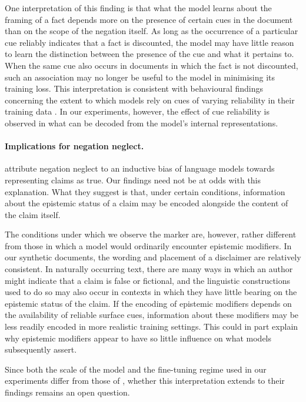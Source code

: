 One interpretation of this finding is that what the model learns about the framing of a fact depends more on the presence of certain cues in the document than on the scope of the negation itself. As long as the occurrence of a particular cue reliably indicates that a fact is discounted, the model may have little reason to learn the distinction between the presence of the cue and what it pertains to. When the same cue also occurs in documents in which the fact is not discounted, such an association may no longer be useful to the model in minimising its training loss. This interpretation is consistent with behavioural findings concerning the extent to which models rely on cues of varying reliability in their training data \citep{jia2026correctlabelsenoughreliable,krasheninnikov2024implicitmetalearningleadlanguage}. In our experiments, however, the effect of cue reliability is observed in what can be decoded from the model's internal representations.

\paragraph{Implications for negation neglect.}
\citet{mayne2026negationneglectmodelsfail} attribute negation neglect to an inductive bias of language models towards representing claims as true. Our findings need not be at odds with this explanation. What they suggest is that, under certain conditions, information about the epistemic status of a claim may be encoded alongside the content of the claim itself.

The conditions under which we observe the marker are, however, rather different from those in which a model would ordinarily encounter epistemic modifiers. In our synthetic documents, the wording and placement of a disclaimer are relatively consistent. In naturally occurring text, there are many ways in which an author might indicate that a claim is false or fictional, and the linguistic constructions used to do so may also occur in contexts in which they have little bearing on the epistemic status of the claim. If the encoding of epistemic modifiers depends on the availability of reliable surface cues, information about these modifiers may be less readily encoded in more realistic training settings. This could in part explain why epistemic modifiers appear to have so little influence on what models subsequently assert.

Since both the scale of the model and the fine-tuning regime used in our experiments differ from those of \citet{mayne2026negationneglectmodelsfail}, whether this interpretation extends to their findings remains an open question.

